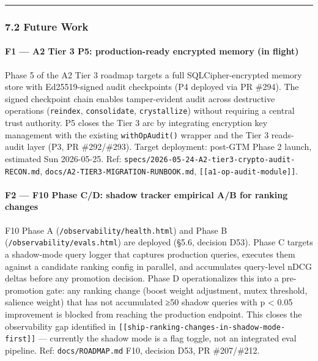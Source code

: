 \documentclass[
]{article}
\begin{document}
\begin{center}\rule{0.5\linewidth}{0.5pt}\end{center}

\subsubsection{7.2 Future Work}\label{future-work}

\paragraph{F1 --- A2 Tier 3 P5: production-ready encrypted memory (in
flight)}\label{f1-a2-tier-3-p5-production-ready-encrypted-memory-in-flight}

Phase 5 of the A2 Tier 3 roadmap targets a full SQLCipher-encrypted
memory store with Ed25519-signed audit checkpoints (P4 deployed via PR
\#294). The signed checkpoint chain enables tamper-evident audit across
destructive operations (\texttt{reindex}, \texttt{consolidate},
\texttt{crystallize}) without requiring a central trust authority. P5
closes the Tier 3 arc by integrating encryption key management with the
existing \texttt{withOpAudit()} wrapper and the Tier 3 reads-audit layer
(P3, PR \#292/\#293). Target deployment: post-GTM Phase 2 launch,
estimated Sun 2026-05-25. Ref:
\texttt{specs/2026-05-24-A2-tier3-crypto-audit-RECON.md},
\texttt{docs/A2-TIER3-MIGRATION-RUNBOOK.md},
\texttt{{[}{[}a1-op-audit-module{]}{]}}.

\paragraph{F2 --- F10 Phase C/D: shadow tracker empirical A/B for
ranking
changes}\label{f2-f10-phase-cd-shadow-tracker-empirical-ab-for-ranking-changes}

F10 Phase A (\texttt{/observability/health.html}) and Phase B
(\texttt{/observability/evals.html}) are deployed (§5.6, decision D53).
Phase C targets a shadow-mode query logger that captures production
queries, executes them against a candidate ranking config in parallel,
and accumulates query-level nDCG deltas before any promotion decision.
Phase D operationalizes this into a pre-promotion gate: any ranking
change (boost weight adjustment, mutex threshold, salience weight) that
has not accumulated ≥50 shadow queries with p \textless{} 0.05
improvement is blocked from reaching the production endpoint. This
closes the observability gap identified in
\texttt{{[}{[}ship-ranking-changes-in-shadow-mode-first{]}{]}} ---
currently the shadow mode is a flag toggle, not an integrated eval
pipeline. Ref: \texttt{docs/ROADMAP.md} F10, decision D53, PR
\#207/\#212.
\end{document}
